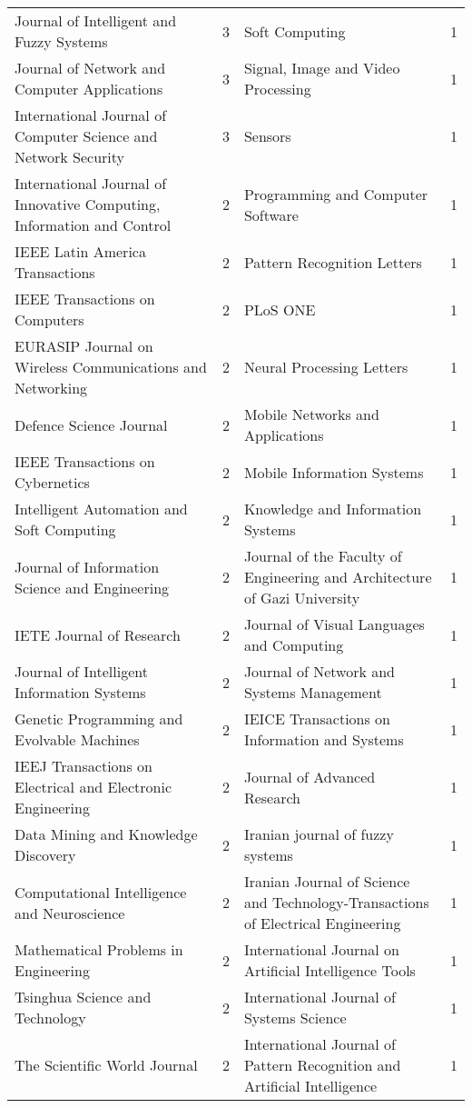 \begin{table*}[!ht]
\begin{adjustbox}{max width=\textwidth}
\begin{tabular}{llll}
Journal of Intelligent and Fuzzy Systems & 3 & Soft Computing & 1   \\ 
Journal of Network and Computer Applications & 3 & Signal, Image and Video Processing & 1   \\ 
International Journal of Computer Science and Network Security & 3 & Sensors & 1   \\ 
International Journal of Innovative Computing, Information and Control & 2 & Programming and Computer Software & 1   \\ 
IEEE Latin America Transactions & 2 & Pattern Recognition Letters & 1   \\ 
IEEE Transactions on Computers & 2 & PLoS ONE & 1   \\ 
EURASIP Journal on Wireless Communications and Networking & 2 & Neural Processing Letters & 1   \\ 
Defence Science Journal & 2 & Mobile Networks and Applications & 1   \\ 
IEEE Transactions on Cybernetics & 2 & Mobile Information Systems & 1   \\ 
Intelligent Automation and Soft Computing & 2 & Knowledge and Information Systems & 1   \\ 
Journal of Information Science and Engineering & 2 & Journal of the Faculty of Engineering and Architecture of Gazi University & 1   \\ 
IETE Journal of Research & 2 & Journal of Visual Languages and Computing & 1   \\ 
Journal of Intelligent Information Systems & 2 & Journal of Network and Systems Management & 1   \\ 
Genetic Programming and Evolvable Machines & 2 & IEICE Transactions on Information and Systems & 1   \\ 
IEEJ Transactions on Electrical and Electronic Engineering & 2 & Journal of Advanced Research & 1   \\ 
Data Mining and Knowledge Discovery & 2 & Iranian journal of fuzzy systems & 1   \\ 
Computational Intelligence and Neuroscience & 2 & Iranian Journal of Science and Technology-Transactions of Electrical Engineering & 1   \\ 
Mathematical Problems in Engineering & 2 & International Journal on Artificial Intelligence Tools & 1   \\ 
Tsinghua Science and Technology & 2 & International Journal of Systems Science & 1   \\ 
The Scientific World Journal & 2 & International Journal of Pattern Recognition and Artificial Intelligence & 1   \\ 

\end{tabular}
\end{adjustbox}
\end{table*}
